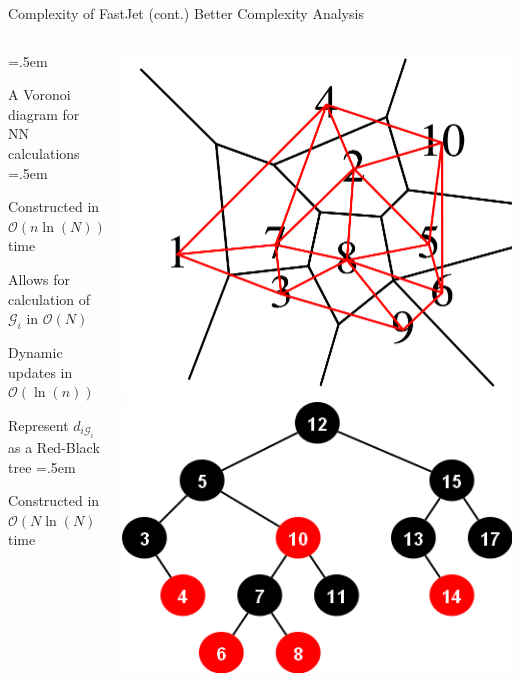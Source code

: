 \documentclass[xcolor={dvipsnames}]{beamer}
\let\olditemize=\itemize
\let\endolditemize=\enditemize
\renewenvironment{itemize}{\olditemize \itemsep=.5em }{\endolditemize}
\newcommand{\ord}[1]{\mathcal{O}(#1)}
\begin{document}
\begin{frame}{Complexity of FastJet (cont.)}
\alert{Better Complexity Analysis}
\begin{columns}[totalwidth=1.2\textwidth]
\begin{column}{.75\textwidth}
    \hspace{10em}
    \begin{itemize}
        \item<2-> A Voronoi diagram for NN calculations
        \begin{itemize}
            \item<3-> Constructed in $\ord{n\ln(N)}$ time
            \item<4-> Allows for calculation of $\mathcal{G}_i$ in $\ord{N}$
            \item<5-> Dynamic updates in $\ord{\ln(n)}$
        \end{itemize}
        \item<6-> Represent $d_{i\mathcal{G}_i}$ as a Red-Black tree
        \begin{itemize}
            \item<7-> Constructed in $\ord{N\ln(N)}$ time
        \end{itemize}
    \end{itemize}
\end{column}
\begin{column}{.45\textwidth}
    \includegraphics[scale=0.2]{VD_diagram.PNG}
    \includegraphics[scale=0.15]{redblacktree.png}

\end{column}
\end{columns}
\end{frame}
\end{document}

